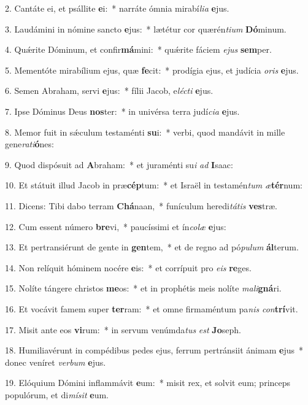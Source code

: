 2. Cantáte ei, et psállite \textbf{e}i:~*  narráte ómnia mirabí\textit{li}\textit{a} \textbf{e}jus.\

3. Laudámini in nómine sancto \textbf{e}jus:~*  lætétur cor quærén\textit{ti}\textit{um} \textbf{Dó}minum.\

4. Quǽrite Dóminum, et confir\textbf{má}mini:~*  quǽrite fáciem \textit{e}\textit{jus} \textbf{sem}per.\

5. Mementóte mirabílium ejus, quæ \textbf{fe}cit:~*  prodígia ejus, et judícia \textit{o}\textit{ris} \textbf{e}jus.\

6. Semen Abraham, servi \textbf{e}jus:~*  fílii Jacob, e\textit{léc}\textit{ti} \textbf{e}jus.\

7. Ipse Dóminus Deus \textbf{nos}ter:~*  in univérsa terra judí\textit{ci}\textit{a} \textbf{e}jus.\

8. Memor fuit in sǽculum testaménti \textbf{su}i:~*  verbi, quod mandávit in mille gene\textit{ra}\textit{ti}\textbf{ó}nes:\

9. Quod dispósuit ad \textbf{A}braham:~*  et juraménti su\textit{i} \textit{ad} \textbf{I}saac:\

10. Et státuit illud Jacob in præ\textbf{cép}tum:~*  et Israël in testamén\textit{tum} \textit{æ}\textbf{tér}num:\

11. Dicens: Tibi dabo terram \textbf{Chá}naan,~*  funículum heredi\textit{tá}\textit{tis} \textbf{ves}træ.\

12. Cum essent número \textbf{bre}vi,~*  paucíssimi et ín\textit{co}\textit{læ} \textbf{e}jus:\

13. Et pertransiérunt de gente in \textbf{gen}tem,~*  et de regno ad pó\textit{pu}\textit{lum} \textbf{ál}terum.\

14. Non relíquit hóminem nocére \textbf{e}is:~*  et corrípuit pro \textit{e}\textit{is} \textbf{re}ges.\

15. Nolíte tángere christos \textbf{me}os:~*  et in prophétis meis nolíte \textit{ma}\textit{li}\textbf{gná}ri.\

16. Et vocávit famem super \textbf{ter}ram:~*  et omne firmaméntum pa\textit{nis} \textit{con}\textbf{trí}vit.\

17. Misit ante eos \textbf{vi}rum:~*  in servum venúmda\textit{tus} \textit{est} \textbf{Jo}seph.\

18. Humiliavérunt in compédibus pedes ejus, ferrum pertránsiit ánimam \textbf{e}jus~*  donec veníret \textit{ver}\textit{bum} \textbf{e}jus.\

19. Elóquium Dómini inflammávit \textbf{e}um:~*  misit rex, et solvit eum; princeps populórum, et di\textit{mí}\textit{sit} \textbf{e}um.\

